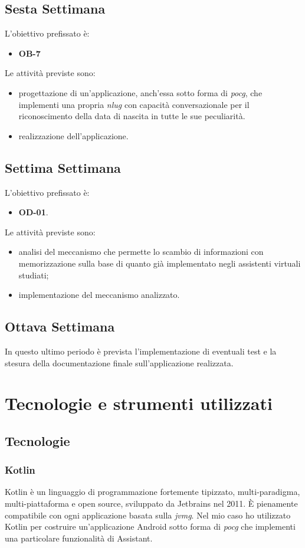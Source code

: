 	\subsection*{Sesta Settimana}
	L'obiettivo prefissato è:
	\begin{itemize}
		\item \textbf{OB-7}
	\end{itemize}
	Le attività previste sono:
	\begin{itemize}
		\item progettazione di un'applicazione, anch'essa sotto forma di \emph{\gls{pocg}}, che implementi una propria \emph{\gls{nlug}} con capacità conversazionale per il riconoscimento della data di nascita in tutte le sue peculiarità.
		\item realizzazione dell'applicazione.
	\end{itemize}
	\subsection*{Settima Settimana}
	L'obiettivo prefissato è:
	\begin{itemize}
		\item \textbf{OD-01}.
	\end{itemize}
	Le attività previste sono:
	\begin{itemize}
		\item analisi del meccanismo che permette lo scambio di informazioni con memorizzazione sulla base di quanto già implementato negli assistenti virtuali studiati;
		\item implementazione del meccanismo analizzato.
	\end{itemize}
	\subsection*{Ottava Settimana}
	In questo ultimo periodo è prevista l'implementazione di eventuali test e la stesura della documentazione finale sull'applicazione realizzata.

\section{Tecnologie e strumenti utilizzati}
	\subsection{Tecnologie}
		\subsubsection{Kotlin}
		Kotlin è un linguaggio di programmazione fortemente tipizzato, multi-paradigma, multi-piattaforma e open source, sviluppato da Jetbrains nel 2011. È pienamente compatibile con ogni applicazione basata sulla \emph{\gls{jvmg}}\glsfirstoccur. Nel mio caso ho utilizzato Kotlin per costruire un'applicazione Android sotto forma di \emph{\gls{pocg}} che implementi una particolare funzionalità di Assistant.

